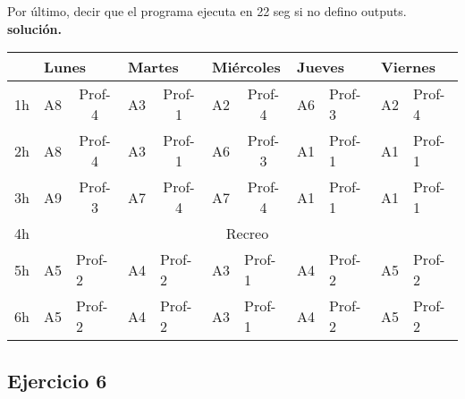 \documentclass[a4paper,11pt]{article}
\begin{document}
Por último, decir que el programa ejecuta en 22 seg si no defino outputs.
\textbf{solución.}
\begin{table}[h]
\begin{tabular}{l|c|c|l|c|l|c|l|l|l|l|}
\cline{2-11}
                         & \multicolumn{2}{l|}{Lunes}                            & \multicolumn{2}{l|}{Martes}                           & \multicolumn{2}{l|}{Miércoles}                        & \multicolumn{2}{l|}{Jueves} & \multicolumn{2}{l|}{Viernes} \\ \hline
\multicolumn{1}{|l|}{1h} & A8                      & Prof-4                      & \multicolumn{1}{c|}{A3} & Prof-1                      & \multicolumn{1}{c|}{A2} & Prof-4                      & A6         & Prof-3         & A2          & Prof-4         \\ \hline
\multicolumn{1}{|l|}{2h} & A8                      & Prof-4                      & \multicolumn{1}{c|}{A3} & Prof-1                      & \multicolumn{1}{c|}{A6} & Prof-3                      & A1         & Prof-1         & A1          & Prof-1         \\ \hline
\multicolumn{1}{|l|}{3h} & A9                      & Prof-3                      & \multicolumn{1}{c|}{A7} & Prof-4                      & \multicolumn{1}{c|}{A7} & Prof-4                      & A1         & Prof-1         & A1          & Prof-1         \\ \hline
\multicolumn{1}{|l|}{4h} & \multicolumn{10}{c|}{Recreo}                                                                                                                                                                                                       \\ \hline
\multicolumn{1}{|l|}{5h} & \multicolumn{1}{l|}{A5} & \multicolumn{1}{l|}{Prof-2} & A4                      & \multicolumn{1}{l|}{Prof-2} & A3                      & \multicolumn{1}{l|}{Prof-1} & A4         & Prof-2         & A5          & Prof-2         \\ \hline
\multicolumn{1}{|l|}{6h} & \multicolumn{1}{l|}{A5} & \multicolumn{1}{l|}{Prof-2} & A4                      & \multicolumn{1}{l|}{Prof-2} & A3                      & \multicolumn{1}{l|}{Prof-1} & A4         & Prof-2         & A5          & Prof-2         \\ \hline
\end{tabular}
\end{table}

\subsection{Ejercicio 6}
\end{document}
